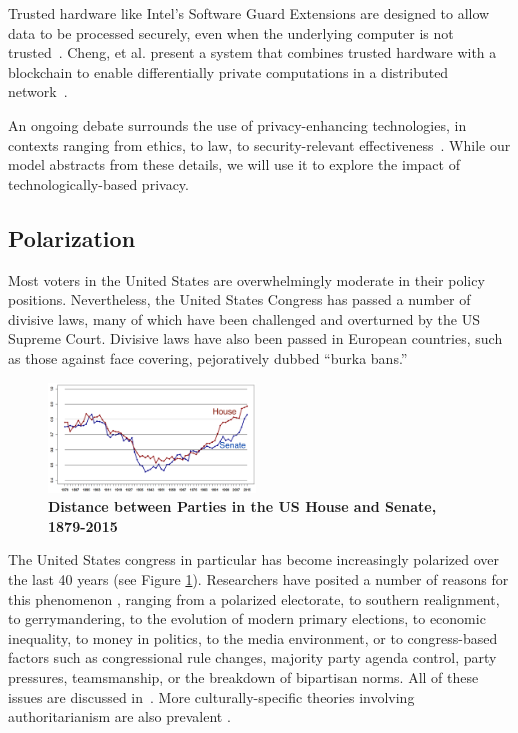Trusted hardware like Intel's Software Guard Extensions are designed to allow data to be processed securely, even when the underlying computer is not trusted~\cite{anati2013innovative}.  Cheng, et al. present a system that combines trusted hardware with a blockchain to enable differentially private computations in a distributed network~\cite{cheng2018ekiden}.

An ongoing debate surrounds the use of privacy-enhancing technologies, in contexts ranging from ethics\cite{lyon2002surveillance,diffie2010privacy}, to law\cite{landau2009,landau2013making,landau2014,Bankston14}, to security-relevant effectiveness~\cite{schneier2013oppression%
}.  While our model abstracts from these details, we will use it to explore the impact of technologically-based privacy.


\subsection{Polarization}
Most voters in the United States are overwhelmingly moderate in their policy positions\cite{layman2006party}.   Nevertheless, the United States Congress has passed a number of divisive laws, many of which have been challenged and overturned by the US Supreme Court.  Divisive laws have also been passed in European countries, such as those against face covering, pejoratively dubbed ``burka bans.''


\begin{figure}[htbp]
\begin{center}
\includegraphics[width=0.49\textwidth]{figs/polar_house_and_senate_46-115_july_11}
\caption{{\bf Distance between Parties in the US House and Senate, 1879-2015}}
\label{fig:uscongress}
\end{center}
\end{figure}

The United States congress in particular has become increasingly polarized over the last 40 years (see Figure \ref{fig:uscongress}).  
Researchers have posited a number of reasons for this phenomenon \cite{barber2015causes}\cite{poole1984polarization}, ranging from a polarized electorate, to southern realignment, to gerrymandering, to the evolution of modern primary elections, to economic inequality, to money in politics, to the media environment, or to congress-based factors such as congressional rule changes, majority party agenda control, party pressures, teamsmanship, or the breakdown of bipartisan norms.  All of these issues are discussed in~\cite{poole1984polarization}.
More culturally-specific theories involving authoritarianism are also prevalent \cite{hetherington2009authoritarianism}.

